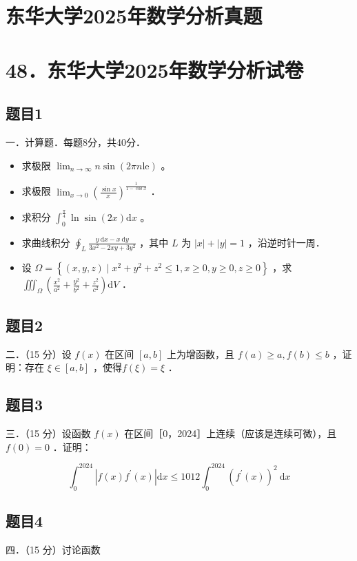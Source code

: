 \documentclass{article}
\begin{document}
\section*{东华大学2025年数学分析真题}
\section*{48．东华大学2025年数学分析试卷}

\subsection{题目1}
一．计算题．每题8分，共40分．

\begin{itemize}
  \item[（1）] 求极限 \(\lim _{n \rightarrow \infty} n \sin (2 \pi n \mathrm{le})\) 。
  \item[（2）] 求极限 \(\lim _{x \rightarrow 0}\left(\frac{\sin x}{x}\right)^{\frac{1}{1-\cos x}}\) ．
  \item[（3）] 求积分 \(\int_{0}^{\frac{\pi}{4}} \ln \sin (2 x) \mathrm{d} x\) 。
  \item[（4）] 求曲线积分 \(\oint_{L} \frac{y \mathrm{~d} x-x \mathrm{~d} y}{3 x^{2}-2 x y+3 y^{2}}\) ，其中 \(L\) 为 \(|x|+|y|=1\) ，沿逆时针一周．
  \item[（5）] 设 \(\Omega=\left\{(x, y, z) \mid x^{2}+y^{2}+z^{2} \leq 1, x \geq 0, y \geq 0, z \geq 0\right\}\) ，求 \(\iiint_{\Omega}\left(\frac{x^{2}}{a^{2}}+\frac{y^{2}}{b^{2}}+\frac{z^{2}}{c^{2}}\right) \mathrm{d} V\) ．
\end{itemize}

\subsection{题目2}
二．（15 分）设 \(f(x)\) 在区间 \([a, b]\) 上为增函数，且 \(f(a) \geq a, f(b) \leq b\) ，证明：存在 \(\xi \in[a, b]\) ，使得\(f(\xi)=\xi\) ．

\subsection{题目3}
三．（15 分）设函数 \(f(x)\) 在区间［0，2024］上连续（应该是连续可微），且 \(f(0)=0\) ．证明：

\[
\int_{0}^{2024}\left|f(x) f^{\prime}(x)\right| \mathrm{d} x \leq 1012 \int_{0}^{2024}\left(f^{\prime}(x)\right)^{2} \mathrm{~d} x
\]

\subsection{题目4}
四．（15 分）讨论函数
\end{document}
